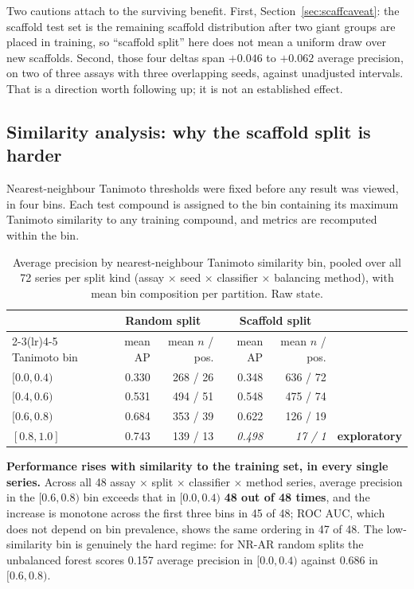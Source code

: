 \documentclass[10pt,letterpaper]{article}
\begin{document}
Two cautions attach to the surviving benefit. First, Section~\ref{sec:scaffcaveat}: the scaffold test
set is the remaining scaffold distribution after two giant groups are placed in training, so
``scaffold split'' here does not mean a uniform draw over new scaffolds. Second, those four deltas
span $+0.046$ to $+0.062$ average precision, on two of three assays with three overlapping seeds,
against unadjusted intervals. That is a direction worth following up; it is not an established
effect.

\subsection{Similarity analysis: why the scaffold split is harder}
\label{sec:similarity}

Nearest-neighbour Tanimoto thresholds were fixed before any result was viewed, in four bins. Each
test compound is assigned to the bin containing its maximum Tanimoto similarity to any training
compound, and metrics are recomputed within the bin.

\begin{table}[!htbp]
\centering
\small
\caption{Average precision by nearest-neighbour Tanimoto similarity bin, pooled over all 72 series
per split kind (assay $\times$ seed $\times$ classifier $\times$ balancing method), with mean bin
composition per partition. Raw state.}
\label{tab:simbins}
\begin{tabular}{@{}lrrrrl@{}}
\toprule
 & \multicolumn{2}{c}{Random split} & \multicolumn{2}{c}{Scaffold split} & \\
\cmidrule(lr){2-3}\cmidrule(lr){4-5}
Tanimoto bin & mean AP & mean $n$ / pos. & mean AP & mean $n$ / pos. & \\
\midrule
$[0.0, 0.4)$ & 0.330 & 268 / 26 & 0.348 & 636 / 72 & \\
$[0.4, 0.6)$ & 0.531 & 494 / 51 & 0.548 & 475 / 74 & \\
$[0.6, 0.8)$ & 0.684 & 353 / 39 & 0.622 & 126 / 19 & \\
$[0.8, 1.0]$ & 0.743 & 139 / 13 & \textit{0.498} & \textit{17 / 1} & \textbf{exploratory} \\
\bottomrule
\end{tabular}
\end{table}

\textbf{Performance rises with similarity to the training set, in every single series.} Across all 48
assay $\times$ split $\times$ classifier $\times$ method series, average precision in the $[0.6,0.8)$
bin exceeds that in $[0.0,0.4)$ \textbf{48 out of 48 times}, and the increase is monotone across the
first three bins in 45 of 48; ROC AUC, which does not depend on bin prevalence, shows the same
ordering in 47 of 48. The low-similarity bin is genuinely the hard regime: for NR-AR random splits
the unbalanced forest scores 0.157 average precision in $[0.0,0.4)$ against 0.686 in $[0.6,0.8)$.
\end{document}
